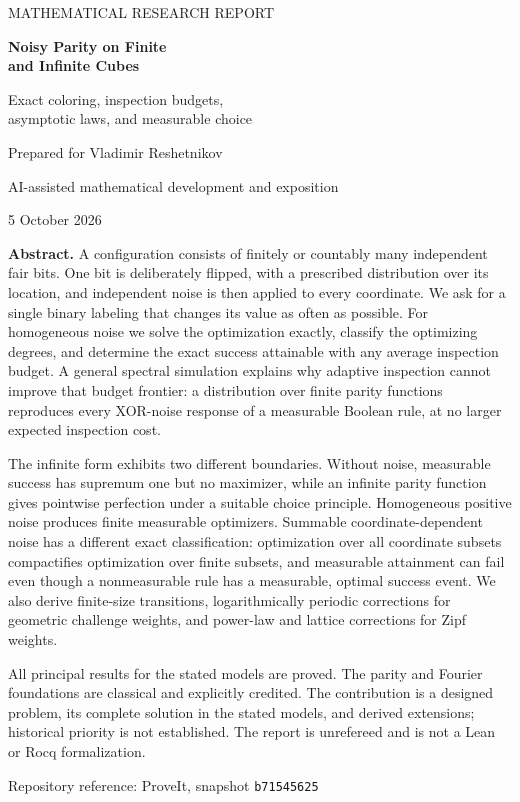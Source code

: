 \documentclass[11pt,a4paper]{article}
\theoremstyle{definition}
\theoremstyle{remark}
\begin{document}
\hypersetup{pageanchor=false}
\begin{titlepage}
\centering
\vspace*{12mm}
{\color{accent}\large MATHEMATICAL RESEARCH REPORT\par}
\vspace{13mm}
{\color{ink}\Huge\bfseries Noisy Parity on Finite\\[4pt] and Infinite Cubes\par}
\vspace{8mm}
{\Large Exact coloring, inspection budgets,\\[3pt]
 asymptotic laws, and measurable choice\par}
\vspace{15mm}
{\large Prepared for Vladimir Reshetnikov\par}
\vspace{3mm}
{AI-assisted mathematical development and exposition\par}
\vspace{3mm}
{5 October 2026\par}
\vspace{13mm}
\begin{minipage}{0.91\textwidth}
\small
\textbf{Abstract.}
A configuration consists of finitely or countably many independent fair bits.
One bit is deliberately flipped, with a prescribed distribution over its
location, and independent noise is then applied to every coordinate.
We ask for a single binary labeling that changes its value as often as
possible. For homogeneous noise we solve the optimization exactly, classify
the optimizing degrees, and determine the exact success attainable with
any average inspection budget. A general spectral simulation explains why
adaptive inspection cannot improve that budget frontier: a distribution over
finite parity functions reproduces every XOR-noise response of a measurable
Boolean rule, at no larger expected inspection cost.

The infinite form exhibits two different boundaries. Without noise,
measurable success has supremum one but no maximizer, while an infinite
parity function gives pointwise perfection under a suitable choice principle.
Homogeneous positive noise produces finite measurable optimizers.
Summable coordinate-dependent noise has a different exact classification:
optimization over all coordinate subsets compactifies optimization over finite
subsets, and measurable attainment can fail even though a nonmeasurable rule
has a measurable, optimal success event. We also derive finite-size
transitions, logarithmically periodic corrections for geometric challenge
weights, and power-law and lattice corrections for Zipf weights.

All principal results for the stated models are proved. The parity and Fourier
foundations are classical and explicitly credited. The contribution is a
designed problem, its complete solution in the stated models, and derived
extensions; historical priority is not established. The report is unrefereed
and is not a Lean or Rocq formalization.
\end{minipage}
\vfill
{\small Repository reference: ProveIt, snapshot \texttt{b71545625}\par}
\end{titlepage}
\end{document}
